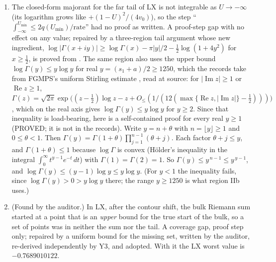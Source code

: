 \documentclass[11pt]{article}
\theoremstyle{definition}
\newcommand{\re}{\operatorname{Re}}
\newcommand{\im}{\operatorname{Im}}
\begin{document}
\begin{enumerate}[label=B\arabic*.]
\item The closed-form majorant for the far tail of LX is not integrable as $U \to -\infty$ (its logarithm grows like $+(1-U)^2/(4v_0)$), so the step ``$\int_{-\infty}^{U_{\min}} \le 2q(U_{\min})/\mathrm{rate}$'' had no proof as written. A proof-step gap with no effect on any value; repaired by a three-region tail argument whose new ingredient, $\log|\Gamma(x+iy)| \ge \log\Gamma(x) - \pi|y|/2 - \tfrac12\log(1+4y^2)$ for $x \ge \tfrac12$, is proved from \cite[5.7.6]{DLMF}. The same region also uses the upper bound $\log\Gamma(y) \le y\log y$ for real $y = (s_1 + a)/2 \ge 1250$, which the records take from FGMPS's uniform Stirling estimate \cite[Lemma 4.2(5)]{FGMPS2026}, read at source: for $|\im z| \ge 1$ or $\re z \ge 1$, $\Gamma(z) = \sqrt{2\pi}\exp\bigl((z-\tfrac12)\log z - z + O_{\le}(1/(12(\max\{\re z, |\im z|\} - \tfrac12)))\bigr)$, which on the real axis gives $\log\Gamma(y) \le y\log y$ for $y \ge 2$. Since that inequality is load-bearing, here is a self-contained proof for every real $y \ge 1$ (PROVED; it is not in the records). Write $y = n + \theta$ with $n = \lfloor y\rfloor \ge 1$ and $0 \le \theta < 1$. Then $\Gamma(y) = \Gamma(1+\theta)\prod_{j=1}^{n-1}(\theta + j)$. Each factor $\theta + j \le y$, and $\Gamma(1+\theta) \le 1$ because $\log\Gamma$ is convex (H\"older's inequality in the integral $\int_0^\infty t^{y-1}e^{-t}\,dt$) with $\Gamma(1) = \Gamma(2) = 1$. So $\Gamma(y) \le y^{\,n-1} \le y^{\,y-1}$, and $\log\Gamma(y) \le (y-1)\log y \le y\log y$. (For $y < 1$ the inequality fails, since $\log\Gamma(y) > 0 > y\log y$ there; the range $y \ge 1250$ is what region IIb uses.)
\item (Found by the auditor.) In LX, after the contour shift, the bulk Riemann sum started at a point that is an \emph{upper} bound for the true start of the bulk, so a set of points was in neither the sum nor the tail. A coverage gap, proof step only; repaired by a uniform bound for the missing set, written by the auditor, re-derived independently by Y3, and adopted. With it the LX worst value is $-0.7689010122$.
\end{enumerate}
\end{document}
